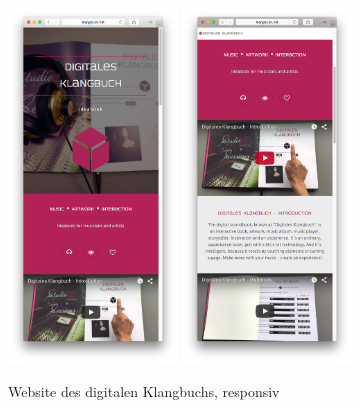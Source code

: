 \begin{figure}[H]
\centering
\caption{Website des digitalen Klangbuchs, responsiv}
\includegraphics[width=0.4\textwidth]{100_anhang/website_r1.png}
\includegraphics[width=0.4\textwidth]{100_anhang/website_r2.png}
\end{figure}


